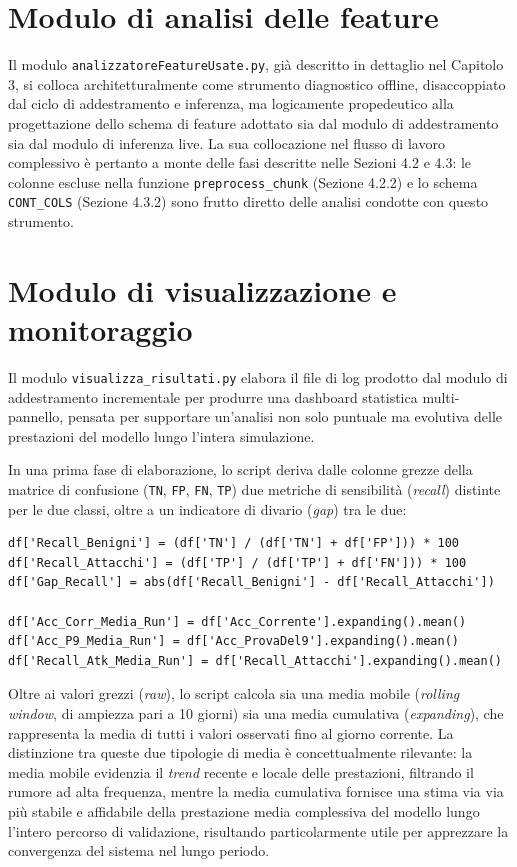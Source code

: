 \documentclass[12pt,a4paper]{report}
\begin{document}
\section{Modulo di analisi delle feature}

Il modulo \texttt{analizzatoreFeatureUsate.py}, già descritto in dettaglio nel Capitolo 3, si colloca architetturalmente come strumento diagnostico offline, disaccoppiato dal ciclo di addestramento e inferenza, ma logicamente propedeutico alla progettazione dello schema di feature adottato sia dal modulo di addestramento sia dal modulo di inferenza live. La sua collocazione nel flusso di lavoro complessivo è pertanto a monte delle fasi descritte nelle Sezioni 4.2 e 4.3: le colonne escluse nella funzione \texttt{preprocess\_chunk} (Sezione 4.2.2) e lo schema \texttt{CONT\_COLS} (Sezione 4.3.2) sono frutto diretto delle analisi condotte con questo strumento.

\section{Modulo di visualizzazione e monitoraggio}

Il modulo \texttt{visualizza\_risultati.py} elabora il file di log prodotto dal modulo di addestramento incrementale per produrre una dashboard statistica multi-pannello, pensata per supportare un'analisi non solo puntuale ma evolutiva delle prestazioni del modello lungo l'intera simulazione.

In una prima fase di elaborazione, lo script deriva dalle colonne grezze della matrice di confusione (\texttt{TN}, \texttt{FP}, \texttt{FN}, \texttt{TP}) due metriche di sensibilità (\emph{recall}) distinte per le due classi, oltre a un indicatore di divario (\emph{gap}) tra le due:

\begin{lstlisting}[caption={Calcolo delle metriche di recall e delle medie mobili (\texttt{visualizza\_risultati.py})}]
df['Recall_Benigni'] = (df['TN'] / (df['TN'] + df['FP'])) * 100
df['Recall_Attacchi'] = (df['TP'] / (df['TP'] + df['FN'])) * 100
df['Gap_Recall'] = abs(df['Recall_Benigni'] - df['Recall_Attacchi'])

df['Acc_Corr_Media_Run'] = df['Acc_Corrente'].expanding().mean()
df['Acc_P9_Media_Run'] = df['Acc_ProvaDel9'].expanding().mean()
df['Recall_Atk_Media_Run'] = df['Recall_Attacchi'].expanding().mean()
\end{lstlisting}

Oltre ai valori grezzi (\emph{raw}), lo script calcola sia una media mobile (\emph{rolling window}, di ampiezza pari a 10 giorni) sia una media cumulativa (\emph{expanding}), che rappresenta la media di tutti i valori osservati fino al giorno corrente. La distinzione tra queste due tipologie di media è concettualmente rilevante: la media mobile evidenzia il \emph{trend} recente e locale delle prestazioni, filtrando il rumore ad alta frequenza, mentre la media cumulativa fornisce una stima via via più stabile e affidabile della prestazione media complessiva del modello lungo l'intero percorso di validazione, risultando particolarmente utile per apprezzare la convergenza del sistema nel lungo periodo.
\end{document}
